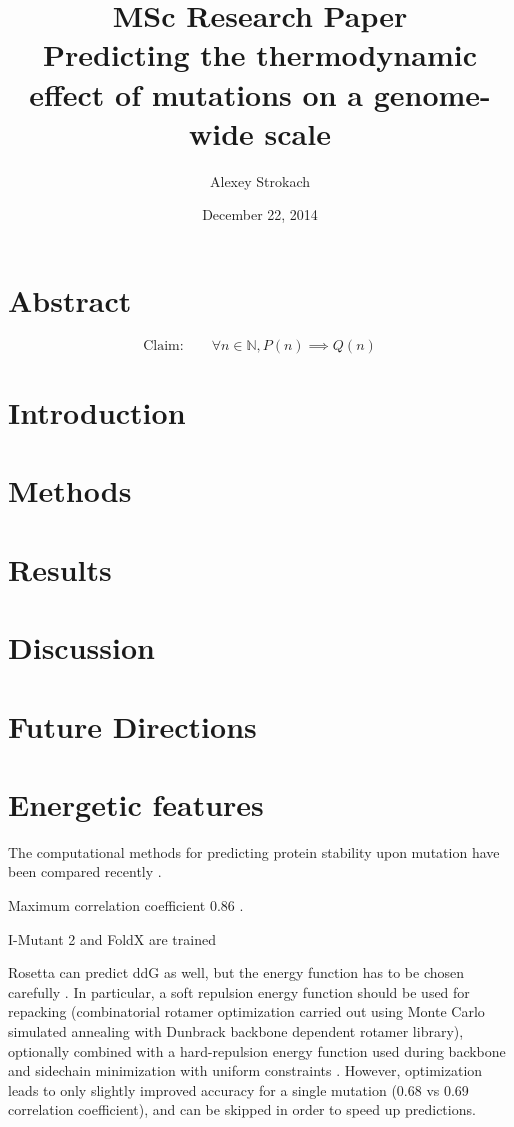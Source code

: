 \documentclass[11pt]{article}
\title{MSc Research Paper \vspace{0.2cm} \\ Predicting the thermodynamic effect of mutations on a genome-wide scale
\vspace{0.2cm}}
\author{Alexey Strokach}
\date{December 22, 2014}
\begin{document}
\maketitle

\onehalfspacing


\section*{Abstract}

$$\text{Claim:} \quad\quad \forall n \in \mathbb{N}, P(n) \implies Q(n)$$



\section{Introduction}




\section{Methods}




\section{Results}




\section{Discussion}




\section{Future Directions}




\section{Energetic features}


The computational methods for predicting protein stability upon mutation have been compared recently \cite{Potapov2009}.

Maximum correlation coefficient 0.86 \cite{Potapov2009}.

I-Mutant 2 and FoldX are trained

Rosetta can predict ddG as well, but the energy function has to be chosen carefully \cite{Kellogg2011}. In particular, a soft repulsion energy function should be used for repacking (combinatorial rotamer optimization carried out using Monte Carlo simulated annealing with Dunbrack backbone dependent rotamer library), optionally combined with a hard-repulsion energy function used during backbone and sidechain minimization with uniform constraints \cite{Kellogg2011}. However, optimization leads to only slightly improved accuracy for a single mutation (0.68 vs 0.69 correlation coefficient), and can be skipped in order to speed up predictions. 
\end{document}
